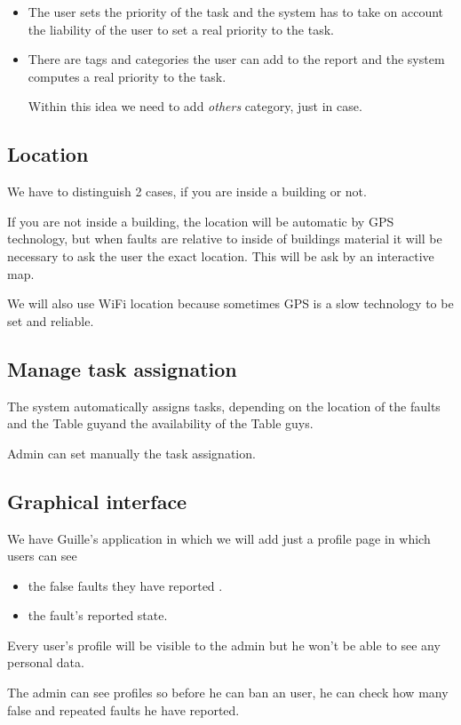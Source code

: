 \documentclass{article}
\newcommand{\tbg}{Table guy}
\newcommand{\tbgs}{Table guys}
\begin{document}
\begin{itemize}
\item The user sets the priority of the task and the system has to take on account the liability of the user to set a real priority to the task.

\item There are tags and categories the user can add to the report and the system computes a real priority to the task.

Within this idea we need to add \textit{others} category, just in case.
\end{itemize}

\subsection{Location}

We have to distinguish 2 cases, if you are inside a building or not.

If you are not inside a building, the location will be automatic by GPS technology, but when faults are relative to inside of buildings material it will be necessary to ask the user the exact location. This will be ask by an interactive map.


We will also use WiFi location because sometimes GPS is a slow technology to be set and reliable.

\subsection{Manage task assignation}
The system automatically assigns tasks, depending on the location of the faults and the \tbg and the availability of the \tbgs.

Admin can set manually the task assignation.

\subsection{Graphical interface}
We have Guille's application in which we will add just a profile page in which users can see
\begin{itemize}
\item the false faults they have reported .
\item the fault's reported state.
\end{itemize}

Every user's profile will be visible to the admin but he won't be able to see any personal data.

The admin can see profiles so before he can ban an user, he can check how many false and repeated faults he have reported.
\end{document}
